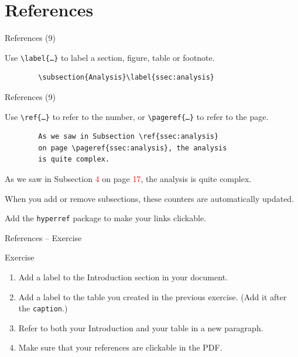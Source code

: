 \documentclass{beamer}
\newcommand{\code}[1]{\texttt{#1}}
\newcommand{\command}[2]{\texttt{\textbackslash#1\{#2\}}}
\newcommand{\red}[1]{\textcolor{red}{#1}}
\begin{document}
\section{References}

\begin{frame}[fragile]{References (9)}

    Use \command{label}{\ldots} to label a section, figure, table or footnote.

    \medskip

    \begin{verbatim}
        \subsection{Analysis}\label{ssec:analysis}
    \end{verbatim}

\end{frame}

\begin{frame}[fragile]{References (9)}

    Use \command{ref}{\ldots} to refer to the number, or \command{pageref}{\ldots} to refer to the page.

    \medskip


    \small
    \begin{verbatim}
        As we saw in Subsection \ref{ssec:analysis} 
        on page \pageref{ssec:analysis}, the analysis
        is quite complex.
    \end{verbatim}
    \normalsize

    \begin{center}
        As we saw in Subsection \red{4} on page \red{17}, the analysis is quite complex.
    \end{center}

    \medskip

    When you add or remove subsections, these counters are automatically updated.

    \medskip

    Add the \code{hyperref} package to make your links clickable.

\end{frame}

\begin{frame}{References -- Exercise}
    \begin{block}{Exercise}
        \begin{enumerate}
            \item Add a label to the Introduction section in your document.
            \item Add a label to the table you created in the previous exercise. (Add it after the \code{caption}.)
            \item Refer to both your Introduction and your table in a new paragraph.
            \item Make sure that your references are clickable in the PDF.
        \end{enumerate}
    \end{block}
\end{frame}
\end{document}
